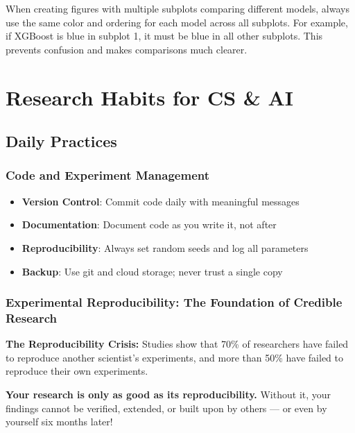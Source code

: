 \documentclass[11pt,a4paper]{article}
\begin{document}
\begin{tcolorbox}[colback=yellow!5,colframe=orange!60,title={Note: Multi-Subplot Consistency}]
When creating figures with multiple subplots comparing different models, always use the same color and ordering for each model across all subplots. For example, if XGBoost is blue in subplot 1, it must be blue in all other subplots. This prevents confusion and makes comparisons much clearer.
\end{tcolorbox}

\section{Research Habits for CS \& AI}

\subsection{Daily Practices}

\subsubsection{Code and Experiment Management}
\begin{itemize}
    \item \textbf{Version Control}: Commit code daily with meaningful messages
    \item \textbf{Documentation}: Document code as you write it, not after
    \item \textbf{Reproducibility}: Always set random seeds and log all parameters
    \item \textbf{Backup}: Use git and cloud storage; never trust a single copy
\end{itemize}

\subsubsection{Experimental Reproducibility: The Foundation of Credible Research}

\begin{tcolorbox}[colback=blue!5,colframe=blue!40,title={Why Reproducibility Matters}]
\textbf{The Reproducibility Crisis:} Studies show that 70\% of researchers have failed to reproduce another scientist's experiments, and more than 50\% have failed to reproduce their own experiments.

\textbf{Your research is only as good as its reproducibility.} Without it, your findings cannot be verified, extended, or built upon by others — or even by yourself six months later!
\end{tcolorbox}
\end{document}
